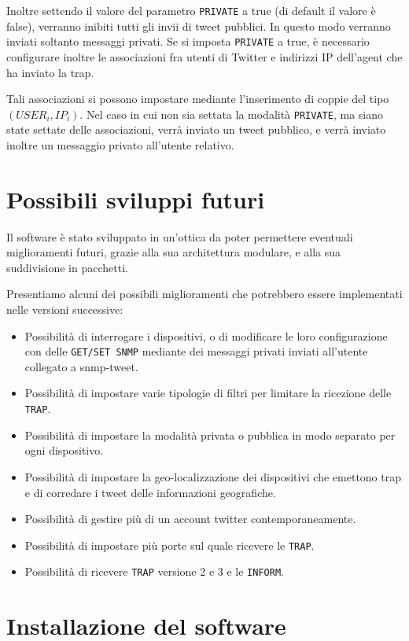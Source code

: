 \documentclass[a4paper, 10pt]{article}
\begin{document}
Inoltre settendo il valore del parametro \texttt{PRIVATE} a true (di default il valore \`e false), verranno inibiti tutti gli invii di tweet pubblici. In questo modo verranno inviati soltanto messaggi privati. Se si imposta \texttt{PRIVATE} a true, \`e necessario configurare inoltre le associazioni fra utenti di Twitter e indirizzi IP dell'agent che ha inviato la trap.

Tali associazioni si possono impostare mediante l'inserimento di coppie del tipo $(USER_i, IP_i)$. Nel caso in cui non sia settata la modalit\`a \texttt{PRIVATE}, ma siano state settate delle associazioni, verr\`a inviato un tweet pubblico, e verr\`a inviato inoltre un messaggio privato all'utente relativo.

\section{Possibili sviluppi futuri}

Il software \`e stato sviluppato in un'ottica da poter permettere eventuali miglioramenti futuri, grazie alla sua architettura modulare, e alla sua suddivisione in pacchetti.

Presentiamo alcuni dei possibili miglioramenti che potrebbero essere implementati nelle versioni successive:

\begin{itemize}
	\item Possibilit\`a di interrogare i dispositivi, o di modificare le loro configurazione con delle \texttt{GET/SET SNMP} mediante dei messaggi privati inviati all'utente collegato a snmp-tweet.
	\item Possibilit\`a di impostare varie tipologie di filtri per limitare la ricezione delle \texttt{TRAP}.
	\item Possibilit\`a di impostare la modalit\`a privata o pubblica in modo separato per ogni dispositivo.
	\item Possibilit\`a di impostare la geo-localizzazione dei dispositivi che emettono trap e di corredare i tweet delle informazioni geografiche.
	\item Possibilit\`a di gestire pi\`u di un account twitter contemporaneamente.
	\item Possibilit\`a di impostare pi\`u porte sul quale ricevere le \texttt{TRAP}.
	\item Possibilit\`a di ricevere \texttt{TRAP} versione 2 e 3 e le \texttt{INFORM}.
\end{itemize}

\section{Installazione del software}
\end{document}
